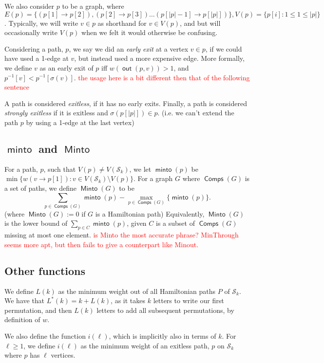 \documentclass{article}
\theoremstyle{definition}
\DeclareMathOperator{\minto}{\bm{\mathsf{minto}}}
\DeclareMathOperator{\Minto}{\bm{\mathsf{Minto}}}
\DeclareMathOperator{\out}{\bm{\mathsf{out}}}
\DeclareMathOperator{\Comp}{\bm{\mathsf{Comps}}}
\newcommand{\edit}[1]{\textcolor{red}{#1}}
\begin{document}
We also consider $p$ to be a graph, where $E(p) = \{(p[1] \to p[2]),(p[2] \to p[3])\dots (p[|p|-1] \to p[|p|])\}, V(p) = \{p[i]:1\le 1 \le |p|\}$. Typically, we will write $v \in p$ as shorthand for $v \in V(p)$, and but will occasionally write $V(p)$ when we felt it would otherwise be confusing.

\vspace{1.75em}

Considering a path, $p$, we say we did an \textit{early exit} at a vertex $v \in p$, if we could have used a 1-edge at $v$, but instead used a more expensive edge. More formally, we define $v$ as an early exit of $p$ iff $w(\out(p,v)) > 1$, and $p^{-1}[v] < p^{-1}[\sigma(v)]$. \edit{the usage here is a bit different then that of the following sentence}

A path is considered \textit{exitless}, if it has no early exits. Finally, a path is considered \textit{strongly exitless} if it is exitless and $\sigma(p[|p|]) \in p$. (i.e. we can't extend the path $p$ by using a 1-edge at the last vertex)

\subsection{\texorpdfstring{$\minto$}{minto} and \texorpdfstring{$\Minto$}{Minto}}

For a path, $p$, such that $V(p) \neq V(\mathcal{S}_k)$, we let $\minto(p)$ be $\min\{ w(v \to p[1]): v \in V(\mathcal{S}_k)\setminus V(p)\}$. For a graph $G$ where $\Comp(G)$ is a set of paths, we define $\Minto(G)$ to be \[\sum_{p \in \Comp(G)} \minto(p) - \max_{p \in \Comp(G)}\{\minto(p)\}.\]
(where $\Minto(G):=0$ if $G$ is a Hamiltonian path) Equivalently, $\Minto(G)$ is the lower bound of $\sum_{p \in C} \minto(p)$, given $C$ is a subset of $\Comp(G)$ missing at most one element. \edit{is Minto the most accurate phrase? MinThrough seems more apt, but then fails to give a counterpart like Minout.}

\subsection{Other functions}
We define $L(k)$ as the minimum weight out of all Hamiltonian paths $P$ of $\mathcal{S}_k$. We have that $L^*(k) = k+L(k)$, as it takes $k$ letters to write our first permutation, and then $L(k)$ letters to add all subsequent permutations, by definition of $w$.

We also define the function $i(\ell)$, which is implicitly also in terms of $k$. For $\ell \geq 1$, we define $i(\ell)$ as the minimum weight of an exitless path, $p$ on $\mathcal{S}_k$ where $p$ has $\ell$ vertices.
\end{document}
